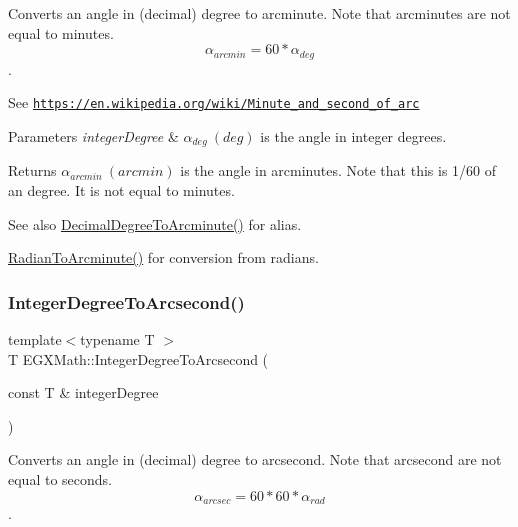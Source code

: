 Converts an angle in (decimal) degree to arcminute. Note that arcminutes are not equal to minutes. \[\alpha_{arcmin}= 60 * \alpha_{deg}\]. 

See \href{https://en.wikipedia.org/wiki/Minute_and_second_of_arc}{\tt https\+://en.\+wikipedia.\+org/wiki/\+Minute\+\_\+and\+\_\+second\+\_\+of\+\_\+arc} 
\begin{DoxyParams}{Parameters}
{\em integer\+Degree} & $\alpha_{deg}\ (deg)$ is the angle in integer degrees. \\
\hline
\end{DoxyParams}
\begin{DoxyReturn}{Returns}
$\alpha_{arcmin}\ (arcmin)$ is the angle in arcminutes. Note that this is 1/60 of an degree. It is not equal to minutes. 
\end{DoxyReturn}
\begin{DoxySeeAlso}{See also}
\mbox{\hyperlink{group___e_g_x_math-_angle_conversions-_decimal_degree_ga6b6ea6e45d2a13f556824ca419cc9fbd}{Decimal\+Degree\+To\+Arcminute()}} for alias. 

\mbox{\hyperlink{group___e_g_x_math-_angle_conversions-_radian_ga722e3b8e78540a6b3942b73b64aeb8d2}{Radian\+To\+Arcminute()}} for conversion from radians. 
\end{DoxySeeAlso}
\mbox{\label{group___e_g_x_math-_angle_conversions-_integer_degree_gaa04058a2fea3dc3678264a05fac6e1ae}} 
\subsubsection{\texorpdfstring{Integer\+Degree\+To\+Arcsecond()}{IntegerDegreeToArcsecond()}}
{\footnotesize\ttfamily template$<$typename T $>$ \\
T E\+G\+X\+Math\+::\+Integer\+Degree\+To\+Arcsecond (\begin{DoxyParamCaption}\item[{const T \&}]{integer\+Degree }\end{DoxyParamCaption})}



Converts an angle in (decimal) degree to arcsecond. Note that arcsecond are not equal to seconds. \[\alpha_{arcsec}=60 * 60 * \alpha_{rad}\]. 

